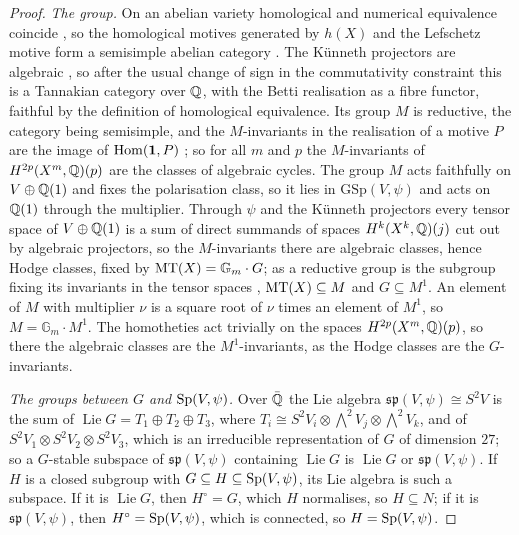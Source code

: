 \begin{proof}
\emph{The group.} On an abelian variety homological and numerical
equivalence coincide \cite{Lie68}, so the homological motives generated by
$h(X)$ and the Lefschetz motive form a semisimple abelian category
\cite{Jan92}. The K\"unneth projectors are algebraic \cite[\S2]{Kle68}, so
after the usual change of sign in the commutativity constraint this is a
Tannakian category over $\mathbb{Q}$, with the Betti realisation as a fibre functor,
faithful by the definition of homological equivalence. Its group $M$ is
reductive, the category being semisimple, and the $M$-invariants in the
realisation of a motive $P$ are the image of $\operatorname{Hom}(\mathbf{1},P)$
\cite[Theorem~2.11]{DM82}; so for all $m$ and $p$ the $M$-invariants of
$H^{2p}(X^{m},\mathbb{Q})(p)$ are the classes of algebraic cycles. The group $M$ acts
faithfully on $V\oplus\mathbb{Q}(1)$ and fixes the polarisation class, so it lies in
$\mathrm{GSp}(V,\psi)$ and acts on $\mathbb{Q}(1)$ through the multiplier. Through
$\psi$ and the K\"unneth projectors every tensor space of $V\oplus\mathbb{Q}(1)$ is a
sum of direct summands of spaces $H^{k}(X^{k},\mathbb{Q})(j)$ cut out by algebraic
projectors, so the $M$-invariants there are algebraic classes, hence Hodge
classes, fixed by $\operatorname{MT}(X)=\mathbb{G}_{m}\cdot G$; as a reductive group is the
subgroup fixing its invariants in the tensor spaces
\cite[Proposition~3.1]{Del82}, $\operatorname{MT}(X)\subseteq M$ and $G\subseteq M^{1}$. An
element of $M$ with multiplier $\nu$ is a square root of $\nu$ times an
element of $M^{1}$, so $M=\mathbb{G}_{m}\cdot M^{1}$. The homotheties act
trivially on the spaces $H^{2p}(X^{m},\mathbb{Q})(p)$, so there the algebraic classes
are the $M^{1}$-invariants, as the Hodge classes are the $G$-invariants.

\emph{The groups between $G$ and $\operatorname{Sp}(V,\psi)$.} Over $\bar{\mathbb{Q}}$ the Lie
algebra $\mathfrak{sp}(V,\psi)\cong S^{2}V$ is the sum of
$\operatorname{Lie}G=T_{1}\oplus T_{2}\oplus T_{3}$, where $T_{i}\cong
S^{2}V_{i}\otimes{\textstyle\bigwedge^{2}}V_{j}\otimes{\textstyle\bigwedge^{2}}V_{k}$, and of
$S^{2}V_{1}\otimes S^{2}V_{2}\otimes S^{2}V_{3}$, which is an irreducible
representation of $G$ of dimension $27$; so a $G$-stable subspace of
$\mathfrak{sp}(V,\psi)$ containing $\operatorname{Lie}G$ is
$\operatorname{Lie}G$ or $\mathfrak{sp}(V,\psi)$. If $H$ is a closed
subgroup with $G\subseteq H\subseteq\operatorname{Sp}(V,\psi)$, its Lie algebra is such a
subspace. If it is $\operatorname{Lie}G$, then $H^{\circ}=G$, which $H$
normalises, so $H\subseteq N$; if it is $\mathfrak{sp}(V,\psi)$, then
$H^{\circ}=\operatorname{Sp}(V,\psi)$, which is connected, so $H=\operatorname{Sp}(V,\psi)$.


\end{proof}
